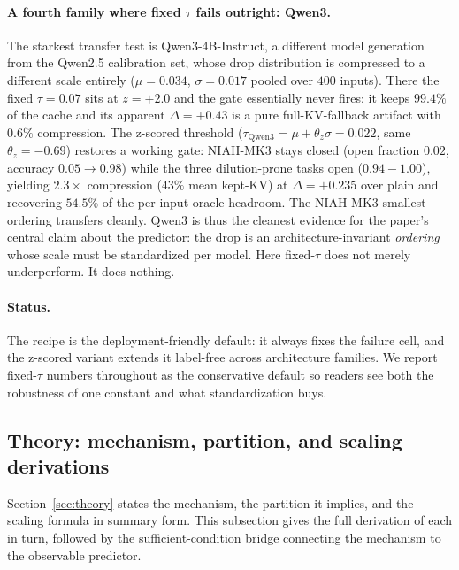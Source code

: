 \paragraph{A fourth family where fixed $\tau$ fails outright: Qwen3.} The
starkest transfer test is Qwen3-4B-Instruct, a different model generation
from the Qwen2.5 calibration set, whose drop distribution is compressed to
a different scale entirely ($\mu = 0.034$, $\sigma = 0.017$ pooled over
$400$ inputs). There the fixed $\tau = 0.07$ sits at $z = +2.0$ and the
gate essentially never fires: it keeps $99.4\%$ of the cache and its
apparent $\Delta = +0.43$ is a pure full-KV-fallback artifact with
$0.6\%$ compression. The z-scored threshold ($\tau_{\text{Qwen3}} = \mu +
\theta_z \sigma = 0.022$, same $\theta_z = -0.69$) restores a working
gate: NIAH-MK3 stays closed (open fraction $0.02$, accuracy $0.05 \to
0.98$) while the three dilution-prone tasks open ($0.94-1.00$),
yielding $2.3\times$ compression ($43\%$ mean kept-KV) at
$\Delta = +0.235$ over plain and recovering $54.5\%$ of the per-input
oracle headroom. The NIAH-MK3-smallest ordering transfers cleanly.
Qwen3 is thus the cleanest evidence for the paper's central claim about
the predictor: the drop is an architecture-invariant \emph{ordering}
whose scale must be standardized per model. Here fixed-$\tau$ does not
merely underperform. It does nothing.

\paragraph{Status.} The recipe is the deployment-friendly default: it always
fixes the failure cell, and the z-scored variant extends it label-free
across architecture families. We report fixed-$\tau$ numbers throughout as
the conservative default so readers see both the robustness of one
constant and what standardization buys.

\subsection{Theory: mechanism, partition, and scaling derivations}

Section~\ref{sec:theory} states the mechanism, the partition it implies,
and the scaling formula in summary form. This subsection gives the full
derivation of each in turn, followed by the sufficient-condition bridge
connecting the mechanism to the observable predictor.

